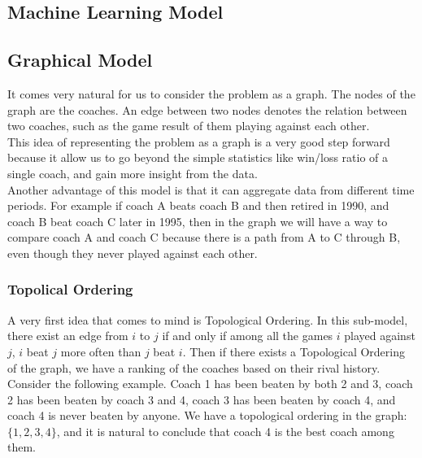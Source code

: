 \documentclass[titlepage]{article}
\begin{document}
\subsection{Machine Learning Model}



\subsection{Graphical Model}
It comes very natural for us to consider the problem as a graph. The nodes of the graph are the coaches. An edge between two nodes denotes the relation between two coaches, such as the game result of them playing against each other.
\\

\noindent This idea of representing the problem as a graph is a very good step forward because it allow us to go beyond the simple statistics like win/loss ratio of a single coach, and gain more insight from the data.
\\

\noindent Another advantage of this model is that it can aggregate data from different time periods. For example if coach A beats coach B and then retired in 1990, and coach B beat coach C later in 1995, then in the graph we will have a way to compare coach A and coach C because there is a path from A to C through B, even though they never played against each other.

\subsubsection{Topolical Ordering}
A very first idea that comes to mind is Topological Ordering. In this sub-model, there exist an edge from $i$ to $j$ if and only if among all the games $i$ played against $j$, $i$ beat $j$ more often than $j$ beat $i$. Then if there exists a Topological Ordering of the graph, we have a ranking of the coaches based on their rival history.
\\

\noindent Consider the following example. Coach 1 has been beaten by both 2 and 3, coach 2 has been beaten by coach 3 and 4, coach 3 has been beaten by coach 4, and coach 4 is never beaten by anyone. We have a topological ordering in the graph: $\{1, 2, 3, 4\}$, and it is natural to conclude that coach 4 is the best coach among them.
\end{document}
